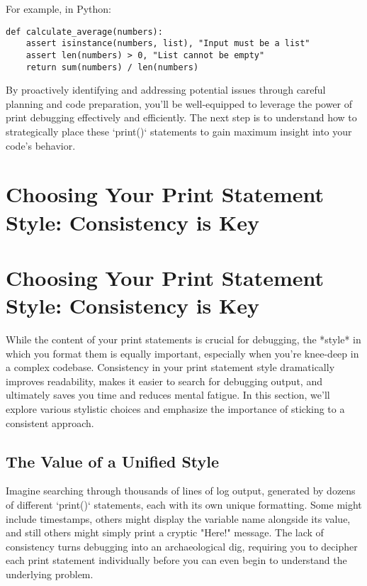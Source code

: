 \documentclass{article}
\begin{document}
For example, in Python:

\begin{verbatim}
def calculate_average(numbers):
    assert isinstance(numbers, list), "Input must be a list"
    assert len(numbers) > 0, "List cannot be empty"
    return sum(numbers) / len(numbers)
\end{verbatim}

By proactively identifying and addressing potential issues through careful planning and code preparation, you'll be well-equipped to leverage the power of print debugging effectively and efficiently. The next step is to understand how to strategically place these `print()` statements to gain maximum insight into your code's behavior.

\newpage

\section*{Choosing Your Print Statement Style: Consistency is Key} %
\label{chapter-2-6-Choosing_Your_Print_Statement_Style__Con}

\section*{Choosing Your Print Statement Style: Consistency is Key}

While the content of your print statements is crucial for debugging, the *style* in which you format them is equally important, especially when you're knee-deep in a complex codebase.  Consistency in your print statement style dramatically improves readability, makes it easier to search for debugging output, and ultimately saves you time and reduces mental fatigue.  In this section, we'll explore various stylistic choices and emphasize the importance of sticking to a consistent approach.

\subsection*{The Value of a Unified Style}

Imagine searching through thousands of lines of log output, generated by dozens of different `print()` statements, each with its own unique formatting. Some might include timestamps, others might display the variable name alongside its value, and still others might simply print a cryptic "Here!" message.  The lack of consistency turns debugging into an archaeological dig, requiring you to decipher each print statement individually before you can even begin to understand the underlying problem.
\end{document}
